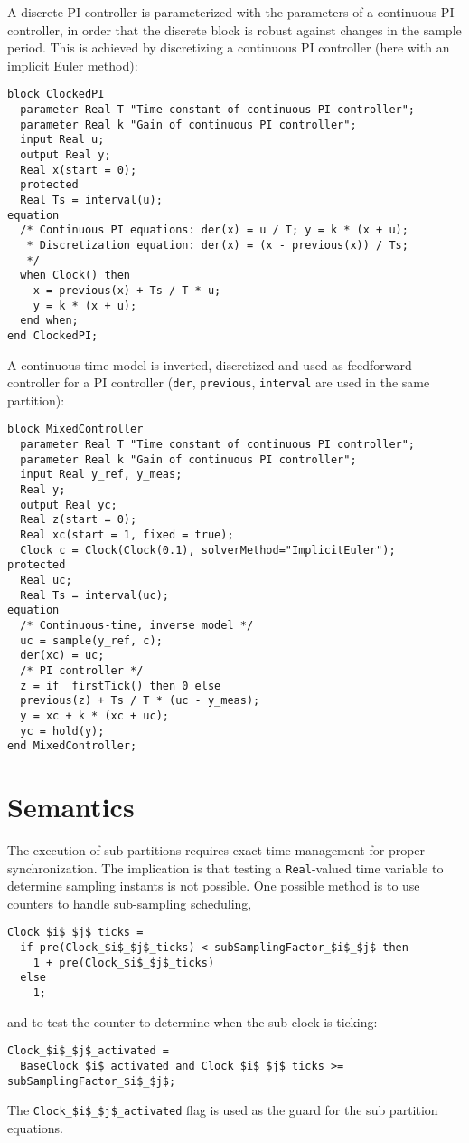 \begin{example}
A discrete PI controller is parameterized with the parameters of a continuous PI controller, in order that the discrete block is robust against changes in the sample period.
This is achieved by discretizing a continuous PI controller (here with an implicit Euler method):
\begin{lstlisting}[language=modelica]
block ClockedPI
  parameter Real T "Time constant of continuous PI controller";
  parameter Real k "Gain of continuous PI controller";
  input Real u;
  output Real y;
  Real x(start = 0);
  protected
  Real Ts = interval(u);
equation
  /* Continuous PI equations: der(x) = u / T; y = k * (x + u);
   * Discretization equation: der(x) = (x - previous(x)) / Ts;
   */
  when Clock() then
    x = previous(x) + Ts / T * u;
    y = k * (x + u);
  end when;
end ClockedPI;
\end{lstlisting}
A continuous-time model is inverted, discretized and used as feedforward controller for a PI controller (\lstinline!der!, \lstinline!previous!, \lstinline!interval! are used in the same partition):
\begin{lstlisting}[language=modelica]
block MixedController
  parameter Real T "Time constant of continuous PI controller";
  parameter Real k "Gain of continuous PI controller";
  input Real y_ref, y_meas;
  Real y;
  output Real yc;
  Real z(start = 0);
  Real xc(start = 1, fixed = true);
  Clock c = Clock(Clock(0.1), solverMethod="ImplicitEuler");
protected
  Real uc;
  Real Ts = interval(uc);
equation
  /* Continuous-time, inverse model */
  uc = sample(y_ref, c);
  der(xc) = uc;
  /* PI controller */
  z = if  firstTick() then 0 else
  previous(z) + Ts / T * (uc - y_meas);
  y = xc + k * (xc + uc);
  yc = hold(y);
end MixedController;
\end{lstlisting}
\end{example}

\section{Semantics}\label{semantics}

The execution of sub-partitions requires exact time management for proper synchronization.
The implication is that testing a \lstinline!Real!-valued time variable to determine sampling instants is not possible.
One possible method is to use counters to handle sub-sampling scheduling,
\begin{lstlisting}[language=modelica]
Clock_$i$_$j$_ticks =
  if pre(Clock_$i$_$j$_ticks) < subSamplingFactor_$i$_$j$ then
    1 + pre(Clock_$i$_$j$_ticks)
  else
    1;
\end{lstlisting}
and to test the counter to determine when the sub-clock is ticking:
\begin{lstlisting}[language=modelica]
Clock_$i$_$j$_activated =
  BaseClock_$i$_activated and Clock_$i$_$j$_ticks >= subSamplingFactor_$i$_$j$;
\end{lstlisting}
The \lstinline!Clock_$i$_$j$_activated! flag is used as the guard for the sub
partition equations.

